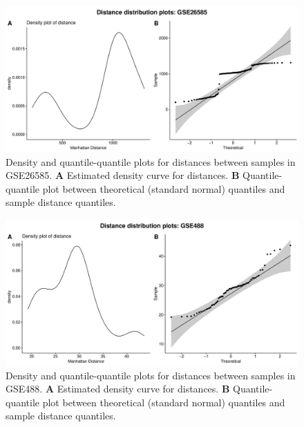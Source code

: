 \documentclass[10pt,letterpaper]{article}\usepackage[]{graphicx}\usepackage[]{color}
\begin{document}
\vspace*{0.2in}

{\Large	
	\textbf{} %
}

\begin{figure}[H]
	\includegraphics[width=\textwidth]{manhattan-distance_hist_GSE26585.pdf}
	\caption{Density and quantile-quantile plots for distances between samples in GSE26585. \textbf{A} Estimated density curve for distances. \textbf{B} Quantile-quantile plot between theoretical (standard normal) quantiles and sample distance quantiles.}
\end{figure}

\begin{figure}[H]
	\includegraphics[width=\textwidth]{manhattan-distance_hist_GSE488.pdf}
	\caption{Density and quantile-quantile plots for distances between samples in GSE488. \textbf{A} Estimated density curve for distances. \textbf{B} Quantile-quantile plot between theoretical (standard normal) quantiles and sample distance quantiles.}
\end{figure}
\end{document}
